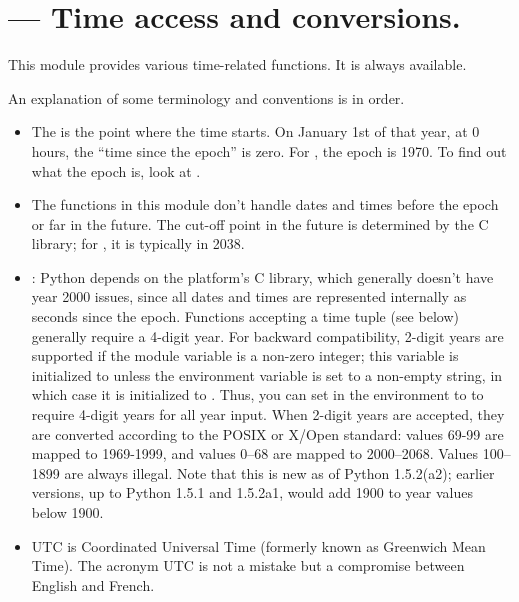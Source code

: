 \section{ ---
         Time access and conversions.}



This module provides various time-related functions.
It is always available.

An explanation of some terminology and conventions is in order.

\begin{itemize}

\item
The  is the point where the time starts.  On
January 1st of that year, at 0 hours, the ``time since the epoch'' is
zero.  For \UNIX{}, the epoch is 1970.  To find out what the epoch is,
look at .%

\item
The functions in this module don't handle dates and times before the
epoch or far in the future.  The cut-off point in the future is
determined by the C library; for \UNIX{}, it is typically in 2038.%

\item
{}: Python depends on the platform's C library,
which generally doesn't have year 2000 issues, since all dates and
times are represented internally as seconds since the epoch.
Functions accepting a time tuple (see below) generally require a
4-digit year.  For backward compatibility, 2-digit years are supported
if the module variable  is a non-zero integer; this
variable is initialized to  unless the environment variable
 is set to a non-empty string, in which case it is
initialized to .  Thus, you can set  in the
environment to  to require 4-digit years for all year input.
When 2-digit years are accepted, they are converted according to the
POSIX or X/Open standard: values 69-99 are mapped to 1969-1999, and
values 0--68 are mapped to 2000--2068.  Values 100--1899 are always
illegal.  Note that this is new as of Python 1.5.2(a2); earlier
versions, up to Python 1.5.1 and 1.5.2a1, would add 1900 to year
values below 1900.%
%

\item
UTC is Coordinated Universal Time (formerly known as Greenwich Mean
Time).  The acronym UTC is not a mistake but a compromise between
English and French.%
%
%


\end{itemize}
